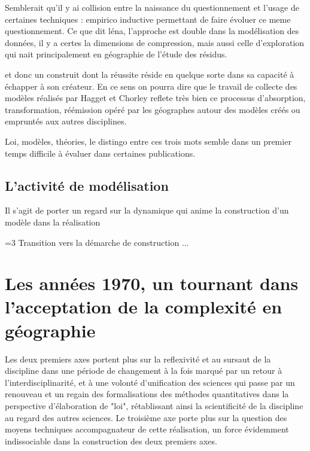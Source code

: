 {Semblerait qu'il y ai collision entre la naissance du questionnement et l'usage de certaines techniques : empirico inductive permettant de faire évoluer ce meme questionnement. Ce que dit léna, l'approche est double dans la modélisation des données, il y a certes la dimensions de compression, mais aussi celle d'exploration qui nait principalement en géographie de l'étude des résidus.

 et donc un construit dont la réussite réside en quelque sorte dans sa capacité à échapper à son créateur. En ce sens on pourra dire que le travail de collecte des modèles réalisés par Hagget et Chorley reflete très bien ce processus d'absorption, transformation, réémission opéré par les géographes autour des modèles créés ou empruntés aux autres disciplines.



Loi, modèles, théories, le distingo entre ces trois mots semble dans un premier temps difficile à évaluer dans certaines publications.

\subsection{L'activité de modélisation}

Il s'agit de porter un regard sur la dynamique qui anime la construction d'un modèle dans la réalisation

=3 Transition vers la démarche de construction ... 

\section{Les années 1970, un tournant dans l'acceptation de la complexité en géographie}


Les deux premiers axes portent plus sur la reflexivité et au sursaut de la discipline dans une période de changement à la fois marqué par un retour à l'interdisciplinarité, et à une volonté d'unification des sciences qui passe par un renouveau et un regain des formalisations des méthodes quantitatives dans la perspective d'élaboration de "loi", rétablissant ainsi la scientificité de la discipline au regard des autres sciences. Le troisième axe porte plus sur la question des moyens techniques accompagnateur de cette réalisation, un force évidemment indissociable dans la construction des deux premiers axes. %

}
